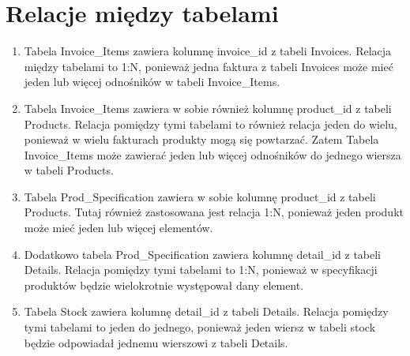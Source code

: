 \documentclass{article}
\begin{document}
\section{Relacje między tabelami}
\begin{enumerate}
   \item Tabela Invoice\_Items zawiera kolumnę invoice\_id z tabeli Invoices.
         Relacja między tabelami to 1:N, ponieważ jedna faktura z tabeli
         Invoices może mieć jeden lub więcej odnośników w tabeli Invoice\_Items.
   \item Tabela Invoice\_Items zawiera w sobie również kolumnę product\_id z
         tabeli Products. Relacja pomiędzy tymi tabelami to również relacja jeden do
         wielu, ponieważ w wielu fakturach produkty mogą się powtarzać. Zatem Tabela
         Invoice\_Items może zawierać jeden lub więcej odnośników do jednego wiersza w
         tabeli Products.
   \item Tabela Prod\_Specification zawiera w sobie kolumnę product\_id z tabeli
         Products. Tutaj również zastosowana jest relacja 1:N, ponieważ jeden
         produkt może mieć jeden lub więcej elementów.
   \item Dodatkowo tabela Prod\_Specification zawiera kolumnę detail\_id z
         tabeli Details. Relacja pomiędzy tymi tabelami to 1:N, ponieważ w
         specyfikacji produktów będzie wielokrotnie występował dany element.
   \item Tabela Stock zawiera kolumnę detail\_id z tabeli Details. Relacja
         pomiędzy tymi tabelami to jeden do jednego, ponieważ jeden wiersz w tabeli
         stock będzie odpowiadał jednemu wierszowi z tabeli Details.
\end{enumerate}
\end{document}
